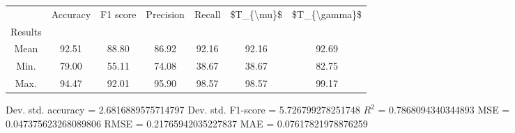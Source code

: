 \begin{tabular}{|c|c|c|c|c|c|c|}
\toprule
{} &  Accuracy &  F1 score &  Precision &  Recall &  \$T\_\{\textbackslash mu\}\$ &  \$T\_\{\textbackslash gamma\}\$ \\
Results &           &           &            &         &            &               \\
\hline
Mean    &     92.51 &     88.80 &      86.92 &   92.16 &      92.16 &         92.69 \\
Min.    &     79.00 &     55.11 &      74.08 &   38.67 &      38.67 &         82.75 \\
Max.    &     94.47 &     92.01 &      95.90 &   98.57 &      98.57 &         99.17 \\
\bottomrule
\end{tabular}

 Dev. std. accuracy = 2.6816889575714797
 Dev. std. F1-score = 5.726799278251748
 $R^2$ = 0.7868094340344893
 MSE = 0.047375623268089806
 RMSE = 0.21765942035227837
 MAE = 0.07617821978876259